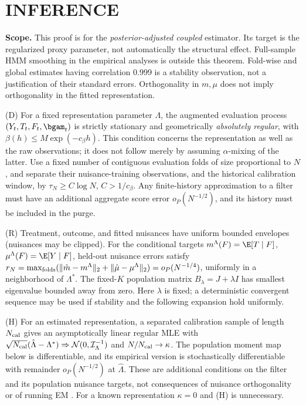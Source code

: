 \section{INFERENCE}
\label{app:proof_asym}
\textbf{Scope.} This proof is for the \emph{posterior-adjusted coupled} estimator. Its target is the regularized proxy parameter, not automatically the structural effect. Full-sample HMM smoothing in the empirical analyses is outside this theorem. Fold-wise and global estimates having correlation 0.999 is a stability observation, not a justification of their standard errors. Orthogonality in $m,\mu$ does not imply orthogonality in the fitted representation.

\begin{assumption}
\label{ass:hmm_gram}
(D) For a fixed representation parameter $\Lambda$, the augmented evaluation process $(Y_t,T_t,F_t,\bgam_t)$ is strictly stationary and geometrically \emph{absolutely regular}, with $\beta(h)\le M\exp(-c_\beta h)$. This condition concerns the representation as well as the raw observations; it does not follow merely by assuming $\alpha$-mixing of the latter. Use a fixed number of contiguous evaluation folds of size proportional to $N$, and separate their nuisance-training observations, and the historical calibration window, by $\tau_N\ge C\log N$, $C>1/c_\beta$. Any finite-history approximation to a filter must have an additional aggregate score error $o_P(N^{-1/2})$, and its history must be included in the purge.

(R) Treatment, outcome, and fitted nuisances have uniform bounded envelopes (nuisances may be clipped). For the conditional targets $m^\Lambda(F)=\E[T\mid F]$, $\mu^\Lambda(F)=\E[Y\mid F]$, held-out nuisance errors satisfy $r_N=\max_{\rm folds}(\|\hat m-m^\Lambda\|_2+\|\hat\mu-\mu^\Lambda\|_2)=o_P(N^{-1/4})$, uniformly in a neighborhood of $\Lambda^*$. The fixed-$K$ population matrix $B_\lambda=J+\lambda I$ has smallest eigenvalue bounded away from zero. Here $\lambda$ is fixed; a deterministic convergent sequence may be used if stability and the following expansion hold uniformly.

(H) For an estimated representation, a separated calibration sample of length $N_{\rm cal}$ gives an asymptotically linear regular MLE with $\sqrt{N_{\rm cal}}(\hat\Lambda-\Lambda^*)\Rightarrow\mathcal N(0,\mathcal I_\Lambda^{-1})$ and $N/N_{\rm cal}\to\kappa$. The population moment map below is differentiable, and its empirical version is stochastically differentiable with remainder $o_P(N^{-1/2})$ at $\hat\Lambda$. These are additional conditions on the filter and its population nuisance targets, not consequences of nuisance orthogonality or of running EM \citep{leroux1992maximum,bickel1998asymptotic,douc2004asymptotic}. For a known representation $\kappa=0$ and (H) is unnecessary.
\end{assumption}

